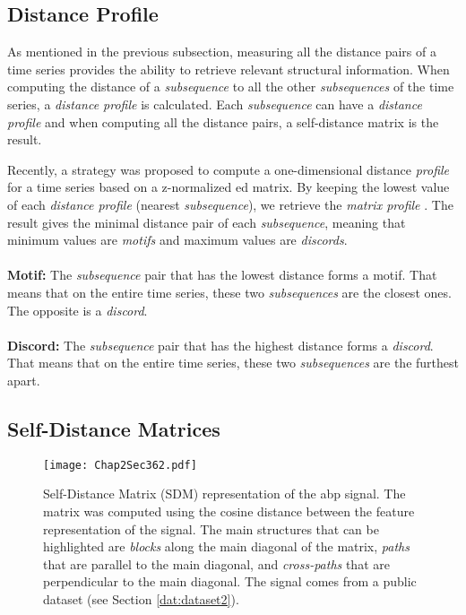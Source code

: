 \subsection{Distance Profile}
\label{subsec:matrixprofile}

As mentioned in the previous subsection, measuring all the distance pairs of a time series provides the ability to retrieve relevant structural information. When computing the distance of a \textit{subsequence} to all the other \textit{subsequences} of the time series, a \textit{distance profile} is calculated. Each \textit{subsequence} can have a \textit{distance profile} and when computing all the distance pairs, a self-distance matrix is the result.
\par
Recently, a strategy was proposed to compute a one-dimensional distance \textit{profile} for a time series based on a z-normalized \gls{ed} matrix. By keeping the lowest value of each \textit{distance profile} (nearest \textit{subsequence}), we retrieve the \textit{matrix profile} \cite{eamonn1}. The result gives the minimal distance pair of each \textit{subsequence}, meaning that minimum values are \textit{motifs} and maximum values are \textit{discords}.\\\\
\textbf{Motif:} The \textit{subsequence} pair that has the lowest distance forms a motif. That means that on the entire time series, these two \textit{subsequences} are the closest ones. The opposite is a \textit{discord}.\\\\
\textbf{Discord:} The \textit{subsequence} pair that has the highest distance forms a \textit{discord}. That means that on the entire time series, these two \textit{subsequences} are the furthest apart.\\

\subsection{Self-Distance Matrices}
\label{subsec:dist_matrix}

\begin{figure}
\centering
\texttt{[image: Chap2Sec362.pdf]}
\caption{Self-Distance Matrix (SDM) representation of the \gls{abp} signal. The matrix was computed using the cosine distance between the feature representation of the signal. The main structures that can be highlighted are \textit{blocks} along the main diagonal of the matrix, \textit{paths} that are parallel to the main diagonal, and \textit{cross-paths} that are perpendicular to the main diagonal. The signal comes from a public dataset (see Section \ref{dat:dataset2}).}
\label{fig:ssm_pre}
\end{figure}

